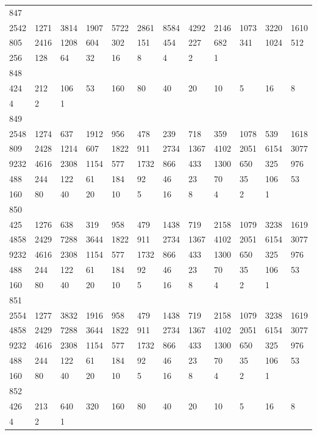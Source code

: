 \begin{longtable}{llllllllllll}
847&&&&&&&&&&&\\
2542& 1271& 3814& 1907& 5722& 2861& 8584& 4292& 2146& 1073& 3220& 1610\\
805& 2416& 1208& 604& 302& 151& 454& 227& 682& 341& 1024& 512\\
256& 128& 64& 32& 16& 8& 4& 2& 1& \\

848&&&&&&&&&&&\\
424& 212& 106& 53& 160& 80& 40& 20& 10& 5& 16& 8\\
4& 2& 1& \\

849&&&&&&&&&&&\\
2548& 1274& 637& 1912& 956& 478& 239& 718& 359& 1078& 539& 1618\\
809& 2428& 1214& 607& 1822& 911& 2734& 1367& 4102& 2051& 6154& 3077\\
9232& 4616& 2308& 1154& 577& 1732& 866& 433& 1300& 650& 325& 976\\
488& 244& 122& 61& 184& 92& 46& 23& 70& 35& 106& 53\\
160& 80& 40& 20& 10& 5& 16& 8& 4& 2& 1& \\

850&&&&&&&&&&&\\
425& 1276& 638& 319& 958& 479& 1438& 719& 2158& 1079& 3238& 1619\\
4858& 2429& 7288& 3644& 1822& 911& 2734& 1367& 4102& 2051& 6154& 3077\\
9232& 4616& 2308& 1154& 577& 1732& 866& 433& 1300& 650& 325& 976\\
488& 244& 122& 61& 184& 92& 46& 23& 70& 35& 106& 53\\
160& 80& 40& 20& 10& 5& 16& 8& 4& 2& 1& \\

851&&&&&&&&&&&\\
2554& 1277& 3832& 1916& 958& 479& 1438& 719& 2158& 1079& 3238& 1619\\
4858& 2429& 7288& 3644& 1822& 911& 2734& 1367& 4102& 2051& 6154& 3077\\
9232& 4616& 2308& 1154& 577& 1732& 866& 433& 1300& 650& 325& 976\\
488& 244& 122& 61& 184& 92& 46& 23& 70& 35& 106& 53\\
160& 80& 40& 20& 10& 5& 16& 8& 4& 2& 1& \\

852&&&&&&&&&&&\\
426& 213& 640& 320& 160& 80& 40& 20& 10& 5& 16& 8\\
4& 2& 1& \\


\end{longtable}
